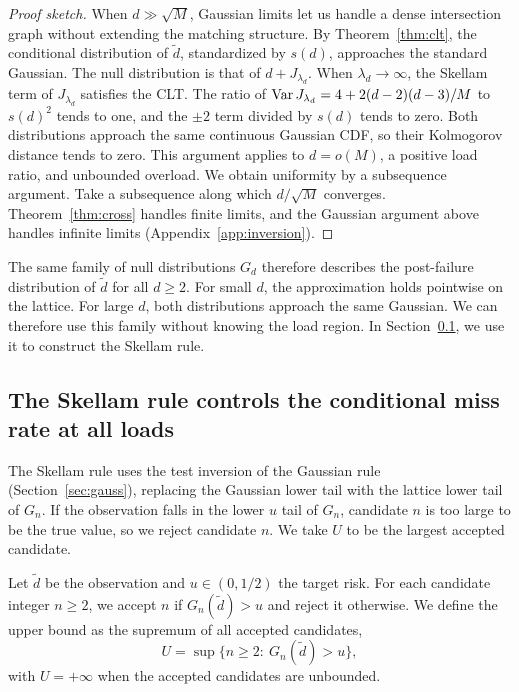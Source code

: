 \begin{proof}[Proof sketch]
When $d\gg\sqrt M$, Gaussian limits let us handle a dense intersection graph without extending the matching structure. By Theorem~\ref{thm:clt}, the conditional distribution of $\widetilde d$, standardized by $s(d)$, approaches the standard Gaussian. The null distribution is that of $d+J_{\lambda_d}$. When $\lambda_d\to\infty$, the Skellam term of $J_{\lambda_d}$ satisfies the CLT. The ratio of $\operatorname{Var} J_{\lambda_d}=4+2(d-2)(d-3)/M$ to $s(d)^2$ tends to one, and the $\pm2$ term divided by $s(d)$ tends to zero. Both distributions approach the same continuous Gaussian CDF, so their Kolmogorov distance tends to zero. This argument applies to $d=o(M)$, a positive load ratio, and unbounded overload. We obtain uniformity by a subsequence argument. Take a subsequence along which $d/\sqrt M$ converges. Theorem~\ref{thm:cross} handles finite limits, and the Gaussian argument above handles infinite limits (Appendix~\ref{app:inversion}).
\end{proof}

The same family of null distributions $G_d$ therefore describes the post-failure distribution of $\widetilde d$ for all $d\ge2$. For small $d$, the approximation holds pointwise on the lattice. For large $d$, both distributions approach the same Gaussian. We can therefore use this family without knowing the load region. In Section~\ref{sec:skellam}, we use it to construct the Skellam rule.

\subsection{The Skellam rule controls the conditional miss rate at all loads}\label{sec:skellam}
The Skellam rule uses the test inversion of the Gaussian rule (Section~\ref{sec:gauss}), replacing the Gaussian lower tail with the lattice lower tail of $G_n$. If the observation falls in the lower $u$ tail of $G_n$, candidate $n$ is too large to be the true value, so we reject candidate $n$. We take $U$ to be the largest accepted candidate.

\begin{definition}\label{def:skellam}
Let $\widetilde d$ be the observation and $u\in(0,1/2)$ the target risk. For each candidate integer $n\ge2$, we accept $n$ if $G_n(\widetilde d)>u$ and reject it otherwise. We define the upper bound as the supremum of all accepted candidates,
\begin{equation}
U=\sup\bigl\{n\ge2:\ G_n(\widetilde d)>u\bigr\},\label{eq:skellam-U}
\end{equation}
with $U=+\infty$ when the accepted candidates are unbounded.
\end{definition}

